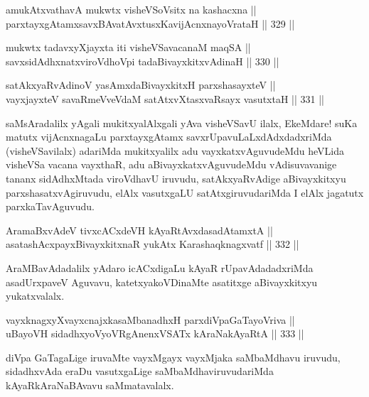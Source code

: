 
\begin{shl}
amukAtxvathavA mukwtx visheVSoV\s sitx na kashacxna || \\
parxtayxgAtamxsavxBAvatAvxtusxKavijAcnxnayoVrataH ||  329 ||  
\end{shl}

\begin{shl}
mukwtx tadavxyXjayxta iti visheVSavacanaM maqSA || \\
savxsidAdhxnatxviroVdhoV\s pi tadaBivayxkitxvAdinaH ||  330 ||  
\end{shl}

\begin{shl}
satAkxyaRvAdinoV yasAmxdaBivayxkitxH parxshasayxteV ||  \\
vayxjayxteV savaRmeVveVdaM satAtxvXtasxvaRsayx vasutxtaH ||  331 ||  
\end{shl}

\begin{artha}
saMsAradalilx yAgali mukitxyalAlxgali yAva visheVSavU ilalx, EkeMdare!
suKa matutx vijAcnxnagaLu parxtayxgAtamx savxrUpavuLaLxdAdxdadxriMda
(visheVSavilalx) adariMda mukitxyalilx adu vayxkatxvAguvudeMdu heVLida
visheVSa vacana vayxthaR, adu aBivayxkatxvAguvudeMdu vAdisuvavanige
tananx sidAdhxMtada viroVdhavU iruvudu, satAkxyaRvAdige aBivayxkitxyu
parxshasatxvAgiruvudu, elAlx vasutxgaLU satAtxgiruvudariMda I elAlx
jagatutx parxkaTavAguvudu.
\end{artha}

\begin{shl}
AramaBxvAdeV tivxcACxdeVH kAyaRtAvxdasadAtamxtA || \\
asatashAcxpayxBivayxkitxnaR yukAtx Karashaqknagxvatf ||  332 ||  
\end{shl}

\begin{artha}
AraMBavAdadalilx yAdaro icACxdigaLu kAyaR rUpavAdadadxriMda
asadUrxpaveV Aguvavu, katetxyakoVDinaMte asatitxge aBivayxkitxyu
yukatxvalalx.
\end{artha}

\begin{shl}
vayxknagxyXvayxcnajxkasaMbanadhxH parxdiVpaGaTayoVriva || \\
uBayoVH sidadhxyoVyoVRgAnenxVSATx kAraNakAyaRtA ||  333 ||  
\end{shl}

\begin{artha}
diVpa GaTagaLige iruvaMte vayxMgayx vayxMjaka saMbaMdhavu iruvudu,
sidadhxvAda eraDu vasutxgaLige saMbaMdhaviruvudariMda
kAyaRkAraNaBAvavu saMmatavalalx.
\end{artha}

